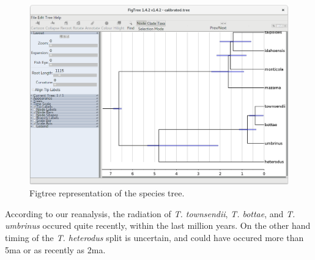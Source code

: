 \documentclass{article}
\begin{document}
\begin{figure}[htb!]
\centering
\includegraphics[width=\textwidth]{figures/figtree-calibrated.png}
\caption{Figtree representation of the species tree.}
\label{fig:figtree}
\end{figure}

According to our reanalysis, the radiation of \textit{T. townsendii},
\textit{T. bottae}, and \textit{T. umbrinus} occured quite recently, within
the last million years. On the other hand timing of the \textit{T. heterodus}
split is uncertain, and could have occured more than 5ma or as recently as 2ma.

\clearpage



\end{document}
